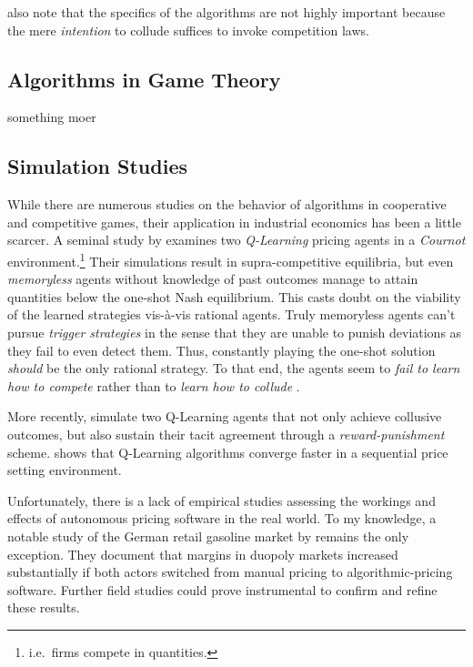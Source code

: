 \textcite{noa}


\textcite{bundeskartellamt_bundeskartellamt_nodate} also note that the specifics of the algorithms are not highly important because the mere \emph{intention} to collude suffices to invoke competition laws.


\subsection{Algorithms in Game Theory}

something moer

\subsection{Simulation Studies}

While there are numerous studies on the behavior of algorithms in cooperative and competitive games, their application in industrial economics has been a little scarcer. A seminal study by \textcite{waltman_q-learning_2008} examines two \emph{Q-Learning} pricing agents in a \emph{Cournot} environment.\footnote{i.e.\ firms compete in quantities.} Their simulations result in supra-competitive equilibria, but even \emph{memoryless} agents without knowledge of past outcomes manage to attain quantities below the one-shot Nash equilibrium.  This casts doubt on the viability of the learned strategies vis-à-vis rational agents. Truly memoryless agents can't pursue \emph{trigger strategies} in the sense that they are unable to punish deviations as they fail to even detect them. Thus, constantly playing the one-shot solution \emph{should} be the only rational strategy. To that end, the agents seem to \emph{fail to learn how to compete} rather than to \emph{learn how to collude} \parencite{cooper_learning_2015}. 






More recently, \textcite{calvano_artificial_2019} simulate two Q-Learning agents that not only achieve collusive outcomes, but also sustain their tacit agreement through a \emph{reward-punishment} scheme. \textcite{klein_autonomous_2019} shows that Q-Learning algorithms converge faster in a sequential price setting environment.







Unfortunately, there is a lack of empirical studies assessing the workings and effects of autonomous pricing software in the real world. To my knowledge, a notable study of the German retail gasoline market by \textcite{assad_algorithmic_2020} remains the only exception. They document that margins in duopoly markets increased substantially if both actors switched from manual pricing to algorithmic-pricing software. Further field studies could prove instrumental to confirm and refine these results.